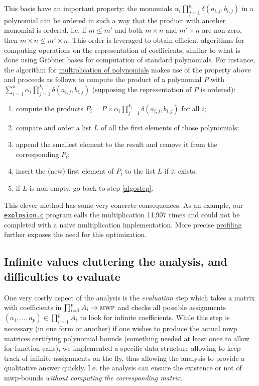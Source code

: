 \documentclass[runningheads]{llncs}
\makeatletter
\newcommand*{\ie}{i.e.\@\xspace}
\newcommand*{\Ie}{I.e.\@\xspace}
\makeatother
\begin{document}
This basis have an important property: the monomials $\alpha_i \prod_{j=1}^{k_i}\delta(a_{i,j},b_{i,j})$ in a polynomial can be ordered in such a way that the product with another monomial is ordered. \ie if \(m\leqslant m'\) and both \(m\times n\) and \(m' \times n\) are non-zero, then \(m\times n\leqslant m'\times n\). This order is leveraged to obtain efficient algorithms for computing operations on the representation of coefficients, similar to what is done using Gröbner bases for computation of standard polynomials.
For instance, the algorithm for \href{https://github.com/seiller/pymwp/blob/746da71a5490c5f21ebc5643ea20822f78876959/pymwp/polynomial.py#L199}{multiplication of polynomials} makes use of the property above and proceeds as follows to compute the product of a polynomial \(P\) with \(\sum_{i=1}^{n} \alpha_i \prod_{j=1}^{k_i}\delta(a_{i,j},b_{i,j})\) (supposing the representation of \(P\) is ordered):
\begin{enumerate}
	\item compute the products \(P_i= P\times \alpha_i \prod_{j=1}^{k_i}\delta(a_{i,j},b_{i,j})\) for all \(i\);
	\item compare and order a list \(L\) of all the first elements of those polynomials;
	      \item\label{algostep} append the smallest element to the result and remove it from the corresponding \(P_i\);
	\item insert the (new) first element of \(P_i\) to the list \(L\) if it exists;
	\item if \(L\) is non-empty, go back to step \ref{algostep}.
\end{enumerate}
This clever method has some very concrete consequences.
As an example, our \href{https://seiller.github.io/pymwp/demo/#other_explosion.c}{\texttt{explosion.c}} program calls the multiplication 11,907 times and could not be completed with a naive multiplication implementation.
More precise \href{https://seiller.github.io/pymwp/utilities/}{profiling} further exposes the need for this optimization.

\subsection{Infinite values cluttering the analysis, and difficulties to evaluate}

One very costly aspect of the analysis is the \emph{evaluation} step which takes a matrix with coefficients in \(\prod_{i=1}^{p} A_i \rightarrow {\textsc{mwp}}\) and checks all possible assignments \((a_1,\dots,a_p)\in \prod_{i=1}^{p} A_i\) to look for infinite coefficients. While this step is necessary (in one form or another) if one wishes to produce the actual mwp matrices certifying polynomial bounds (something needed at least once to allow for function calls), we implemented a specific data structure allowing to keep track of infinite assignments on the fly, thus allowing the analysis to provide a qualitative answer quickly. \Ie the analysis can ensure the existence or not of mwp-bounds \emph{without computing the corresponding matrix}.
\end{document}
